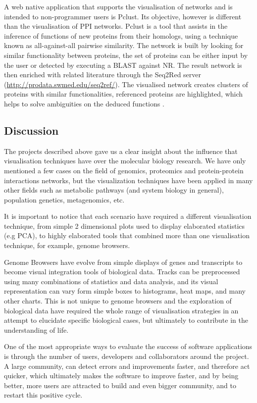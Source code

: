 A web native application that supports the visualisation of networks and is intended to non-programmer users is Pclust. Its objective, however is different than the visualisation of PPI networks. Pclust is a tool that assists in the inference of functions of new proteins from their homologs, using a technique known as all-against-all pairwise similarity. The network is built by looking for similar functionality between proteins, the set of proteins can  be either input by the user or detected by executing a BLAST against NR. The result network is then enriched with related literature through the Seq2Red server (\url{http://prodata.swmed.edu/seq2ref/}). The visualised network creates clusters of proteins with similar functionalities, referenced proteins are highlighted, which helps to solve ambiguities on the deduced functions \cite{Li2013}.


\subsection{Discussion}
The projects described above gave us a clear insight about the influence that visualisation techniques have over the molecular biology research. We have only mentioned a few cases on the field of genomics, proteomics and protein-protein interactions networks, but the visualization techniques have been applied in many other fields such as metabolic pathways (and system biology in general), population genetics, metagenomics, etc.

It is important to notice that each scenario have required a different visualisation technique, from simple 2 dimensional plots used to display elaborated statistics (e.g PCA), to highly elaborated tools that combined more than one visualisation technique, for example, genome browsers.

Genome Browsers have evolve from simple displays of genes and transcripts to become visual integration tools of biological data. Tracks can be preprocessed using many combinations of statistics and data analysis, and its visual representation can vary form simple boxes to histograms, heat maps, and many other charts. This is not unique to genome browsers and the exploration of biological data have required the whole range of visualisation strategies in an attempt to elucidate specific biological cases, but ultimately to contribute in the understanding of life.

One of the most appropriate ways to evaluate the success of software applications is through the number of users, developers and collaborators around the project. A large community, can detect errors and improvements faster, and therefore act quicker, which ultimately makes the software to improve faster, and by being better, more users are attracted to build and even bigger community, and to restart this positive cycle.

